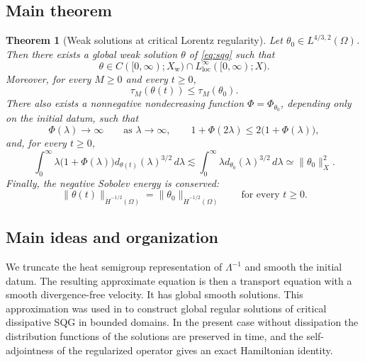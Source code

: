 \documentclass[11pt,reqno]{amsproc}
\newtheorem{theorem}{Theorem}[section]
\newcommand{\Om}{\Omega}
\newcommand{\dd}{\,d}
\begin{document}
\subsection{Main theorem}\label{subsec:main-theorem}

\begin{theorem}[Weak solutions at critical Lorentz regularity]\label{thm:main}
Let $\theta_0\in L^{4/3,2}(\Om)$.
Then there exists a global weak solution $\theta$ of \eqref{eq:sqg} such that
\[
  \theta\in C([0,\infty);X_{\mathrm w})
  \cap L^\infty_{\mathrm{loc}}([0,\infty);X).
\]
Moreover, for every $M\ge0$ and every $t\ge0$,
\begin{equation}\label{eq:tail-bound}
  \tau_M(\theta(t))\le\tau_M(\theta_0).
\end{equation}
There also exists a nonnegative nondecreasing function
$\Phi=\Phi_{\theta_0}$, depending only on the initial datum, such that
\[
  \Phi(\lambda)\longrightarrow\infty
  \qquad\text{as }\lambda\longrightarrow\infty,
  \qquad
  1+\Phi(2\lambda)\le2\bigl(1+\Phi(\lambda)\bigr),
\]
and, for every $t\ge0$,
\begin{equation}\label{eq:weighted-distribution-bound}
  \int_0^\infty
  \lambda\bigl(1+\Phi(\lambda)\bigr)
  d_{\theta(t)}(\lambda)^{3/2}\dd\lambda
  \lesssim
  \int_0^\infty \lambda d_{\theta_0}(\lambda)^{3/2}\dd\lambda
  \simeq \|\theta_0\|_X^2.
\end{equation}
Finally, the negative Sobolev energy is conserved:
\begin{equation}\label{eq:hminus-conservation}
  \|\theta(t)\|_{\dot H^{-1/2}(\Om)}
  =
  \|\theta_0\|_{\dot H^{-1/2}(\Om)}
  \qquad\text{for every }t\ge0 .
\end{equation}
\end{theorem}

\subsection{Main ideas and organization}\label{subsec:strategy}

We truncate the heat semigroup representation of $\Lambda^{-1}$ and smooth
the initial datum.  The resulting approximate equation is then a transport equation
with a smooth divergence-free velocity. It has global smooth solutions. This approximation was used in \cite{Ignatova2019}
to construct global regular solutions of critical dissipative SQG in bounded domains. In the present case without dissipation
 the distribution functions of the solutions are preserved in time, and the self-adjointness of the regularized operator gives an exact
Hamiltonian identity. 
\end{document}
